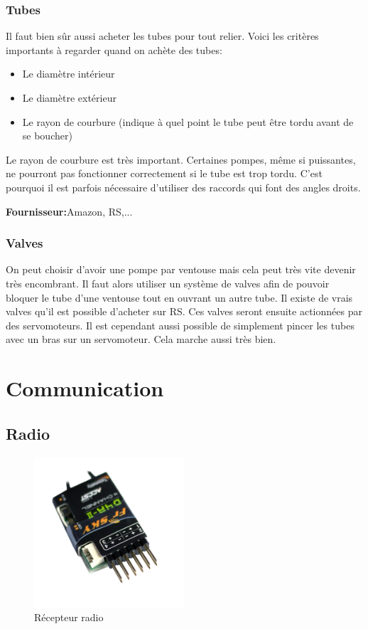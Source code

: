\documentclass[a4paper, 11pt]{report}
\begin{document}
\subsection{Tubes}

Il faut bien sûr aussi acheter les tubes pour tout relier. Voici les critères importants à regarder quand on achète des tubes:
\begin{itemize}
\item Le diamètre intérieur
\item Le diamètre extérieur
\item Le rayon de courbure (indique à quel point le tube peut être tordu avant de se boucher)
\end{itemize}

Le rayon de courbure est très important. Certaines pompes, même si puissantes, ne pourront pas fonctionner correctement si le tube est trop tordu. C'est pourquoi il est parfois nécessaire d'utiliser des raccords qui font des angles droits.

\textbf{Fournisseur:}Amazon, RS,...

\subsection{Valves}
On peut choisir d'avoir une pompe par ventouse mais cela peut très vite devenir très encombrant. Il faut alors utiliser un système de valves afin de pouvoir bloquer le tube d'une ventouse tout en ouvrant un autre tube. Il existe de vrais valves qu'il est possible d'acheter sur RS. Ces valves seront ensuite actionnées par des servomoteurs. Il est cependant aussi possible de simplement pincer les tubes avec un bras sur un servomoteur. Cela marche aussi très bien.


\chapter{Communication}

\section{Radio}

\begin{figure}[h!]
\begin{centering}
\includegraphics[width=0.5\textwidth]{images/recepteurRadio.jpg}
\caption{Récepteur radio}
\par\end{centering}
\end{figure}
\end{document}
